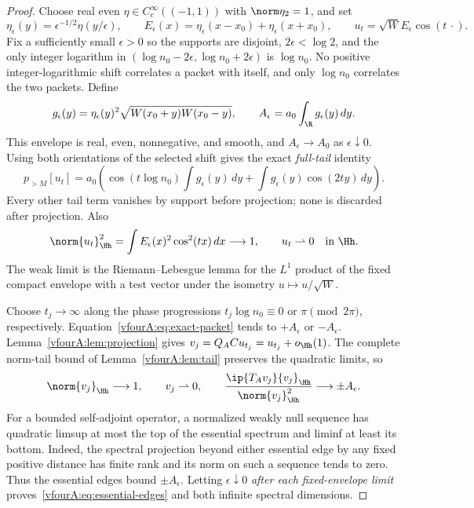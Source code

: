 \begin{proof}
Choose real even $\eta\in C_c^\infty((-1,1))$ with $\norm\eta_2=1$,
and set
\[
 \eta_\epsilon(y)=\epsilon^{-1/2}\eta(y/\epsilon),\qquad
 E_\epsilon(x)=\eta_\epsilon(x-x_0)+\eta_\epsilon(x+x_0),\qquad
 u_t=\sqrt W E_\epsilon\cos(t\,\cdot).
\]
Fix a sufficiently small $\epsilon>0$ so the supports are disjoint,
$2\epsilon<\log2$, and the only integer logarithm in
$(\log n_0-2\epsilon,\log n_0+2\epsilon)$ is $\log n_0$.
No positive integer-logarithmic shift correlates a packet with
itself, and only $\log n_0$ correlates the two packets.  Define
\[
 g_\epsilon(y)=\eta_\epsilon(y)^2
           \sqrt{W(x_0+y)W(x_0-y)},\qquad
 A_\epsilon=a_0\int_\R g_\epsilon(y)\,dy.
\]
This envelope is real, even, nonnegative, and smooth, and
$A_\epsilon\to A_0$ as $\epsilon\downarrow0$.
Using both orientations of the selected shift gives the exact
\emph{full-tail} identity
\begin{equation}\label{vfourA:eq:exact-packet}
 p_{>M}[u_t]
 =a_0\left(\cos(t\log n_0)\int g_\epsilon(y)\,dy
       +\int g_\epsilon(y)\cos(2ty)\,dy\right).
\end{equation}
Every other tail term vanishes by support before projection; none
is discarded after projection.  Also
\begin{equation}\label{vfourA:eq:packet-weak}
 \norm{u_t}_{\Hh}^2
 =\int E_\epsilon(x)^2\cos^2(tx)\,dx\longrightarrow1,
 \qquad u_t\rightharpoonup0\quad\hbox{in }\Hh.
\end{equation}
The weak limit is the Riemann--Lebesgue lemma for the $L^1$ product
of the fixed compact envelope with a test vector under the isometry
$u\mapsto u/\sqrt W$.

Choose $t_j\to\infty$ along the phase progressions
$t_j\log n_0\equiv0$ or $\pi\pmod{2\pi}$, respectively.
Equation~\eqref{vfourA:eq:exact-packet} tends to $+A_\epsilon$ or
$-A_\epsilon$.  Lemma~\ref{vfourA:lem:projection} gives
$v_j=Q_ACu_{t_j}=u_{t_j}+o_{\Hh}(1)$.  The complete norm-tail bound
of Lemma~\ref{vfourA:lem:tail} preserves the quadratic limits, so
\[
 \norm{v_j}_{\Hh}\longrightarrow1,\qquad
 v_j\rightharpoonup0,\qquad
 \frac{\ip{T_Av_j}{v_j}_{\Hh}}{\norm{v_j}_{\Hh}^2}
 \longrightarrow\pm A_\epsilon.
\]
For a bounded self-adjoint operator, a normalized weakly null
sequence has quadratic limsup at most the top of the essential
spectrum and liminf at least its bottom.  Indeed, the spectral
projection beyond either essential edge by any fixed positive
distance has finite rank and its norm on such a sequence tends
to zero.  Thus the essential edges bound $\pm A_\epsilon$.
Letting $\epsilon\downarrow0$ \emph{after each fixed-envelope limit}
proves~\eqref{vfourA:eq:essential-edges} and both infinite spectral
dimensions.


\end{proof}
